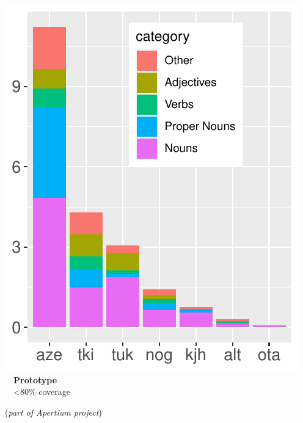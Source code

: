 \documentclass[a0paper,fleqn]{betterposter}
\begin{document}
{\begin{minipage}{0.317\textwidth}
    \includegraphics[width=\textwidth]{img/lgs3}\vspace{-0.8em}\\
    {\color{lightred}~~\textbf{Prototype}}\\
    ~~<80\% coverage
\end{minipage}

\vspace{1.5em}

\begin{center}
	({\em part of Apertium project})
\end{center}

}
\end{document}
